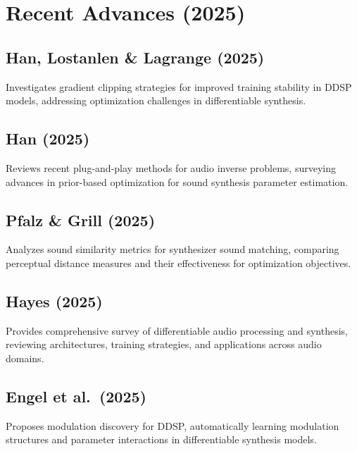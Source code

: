 \documentclass[12pt]{article}
\begin{document}
\section{Recent Advances (2025)}

\subsection*{Han, Lostanlen \& Lagrange (2025) \cite{Han2025eusipco}}
Investigates gradient clipping strategies for improved training stability in DDSP models, addressing optimization challenges in differentiable synthesis.

\subsection*{Han (2025) \cite{HanT2025}}
Reviews recent plug-and-play methods for audio inverse problems, surveying advances in prior-based optimization for sound synthesis parameter estimation.

\subsection*{Pfalz \& Grill (2025) \cite{Pfalz2025metrics}}
Analyzes sound similarity metrics for synthesizer sound matching, comparing perceptual distance measures and their effectiveness for optimization objectives.

\subsection*{Hayes (2025) \cite{Hayes2025}}
Provides comprehensive survey of differentiable audio processing and synthesis, reviewing architectures, training strategies, and applications across audio domains.

\subsection*{Engel et al.\ (2025) \cite{Engel2025modulation}}
Proposes modulation discovery for DDSP, automatically learning modulation structures and parameter interactions in differentiable synthesis models.



\end{document}
